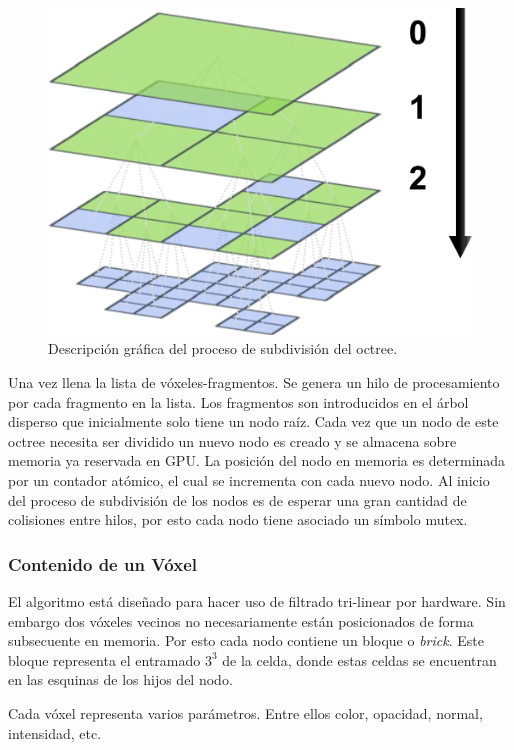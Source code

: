 \begin{figure}
	\includegraphics[width=0.95\linewidth]{media/miplevels.png}
	\caption{Descripción gráfica del proceso de subdivisión del octree.}
	\label{fig:miplevels}
\end{figure}

Una vez llena la lista de vóxeles-fragmentos. Se genera un hilo de procesamiento por cada fragmento en la lista. Los fragmentos son introducidos en el árbol disperso que inicialmente solo tiene un nodo raíz. Cada vez que un nodo de este octree necesita ser dividido un nuevo nodo es creado y se almacena sobre memoria ya reservada en GPU. La posición del nodo en memoria es determinada por un contador atómico, el cual se incrementa con cada nuevo nodo. Al inicio del proceso de subdivisión de los nodos es de esperar una gran cantidad de colisiones entre hilos, por esto cada nodo tiene asociado un símbolo mutex.

\subsubsection{Contenido de un Vóxel}

El algoritmo está diseñado para hacer uso de filtrado tri-linear por hardware. Sin embargo dos vóxeles vecinos no necesariamente están posicionados de forma subsecuente en memoria. Por esto cada nodo contiene un bloque o \emph{brick}. Este bloque representa el entramado $3^3$ de la celda, donde estas celdas se encuentran en las esquinas de los hijos del nodo.

Cada vóxel representa varios parámetros. Entre ellos color, opacidad, normal, intensidad, etc.

